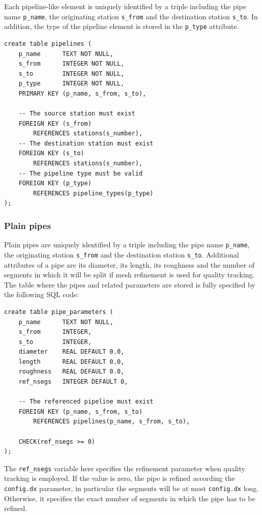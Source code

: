 Each pipeline-like element is uniquely identified by a triple including the pipe
name \texttt{p\_name}, the originating station \texttt{s\_from} and the destination
station \texttt{s\_to}. In addition, the type of the pipeline element is stored
in the \texttt{p\_type} attribute. 
\begin{verbatim}
create table pipelines (
    p_name      TEXT NOT NULL,
    s_from      INTEGER NOT NULL,
    s_to        INTEGER NOT NULL,    
    p_type      INTEGER NOT NULL,
    PRIMARY KEY (p_name, s_from, s_to),

    -- The source station must exist
    FOREIGN KEY (s_from)
        REFERENCES stations(s_number),
    -- The destination station must exist
    FOREIGN KEY (s_to)
        REFERENCES stations(s_number),
    -- The pipeline type must be valid
    FOREIGN KEY (p_type)
        REFERENCES pipeline_types(p_type)
);
\end{verbatim}
\subsubsection{Plain pipes}
Plain pipes are uniquely identified by a triple including the pipe
name \texttt{p\_name}, the originating station \texttt{s\_from} and the destination
station \texttt{s\_to}. Additional attributes of a pipe are its diameter,
its length, its roughness and the number of segments in which it will be split
if mesh refinement is used for quality tracking. The table where the pipes and
related parameters are stored is fully specified by the following SQL code:
\begin{verbatim}
create table pipe_parameters (
    p_name      TEXT NOT NULL,
    s_from      INTEGER,
    s_to        INTEGER,
    diameter    REAL DEFAULT 0.0,
    length      REAL DEFAULT 0.0,
    roughness   REAL DEFAULT 0.0,
    ref_nsegs   INTEGER DEFAULT 0,

    -- The referenced pipeline must exist
    FOREIGN KEY (p_name, s_from, s_to)
        REFERENCES pipelines(p_name, s_from, s_to),

    CHECK(ref_nsegs >= 0)
);
\end{verbatim}

The \texttt{ref\_nsegs} variable here specifies the refinement parameter when quality tracking is employed. If the value is zero, the pipe is refined according the \texttt{config.dx} parameter, in particular the segments will be at most \texttt{config.dx} long. Otherwise, it specifies the exact number of segments in which the pipe has to be refined.
